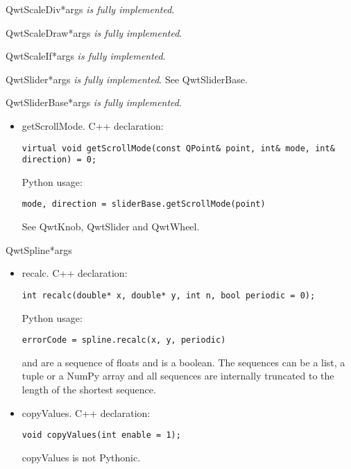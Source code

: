 \documentclass{manual}
\begin{document}
\begin{classdesc}{QwtScaleDiv}{*args}
\emph{is fully implemented}.
\end{classdesc}

\begin{classdesc}{QwtScaleDraw}{*args}
\emph{is fully implemented}.
\end{classdesc}

\begin{classdesc}{QwtScaleIf}{*args}
\emph{is fully implemented}.
\end{classdesc}

\begin{classdesc}{QwtSlider}{*args}
\emph{is fully implemented}. See QwtSliderBase.
\end{classdesc}

\begin{classdesc}{QwtSliderBase}{*args}
\emph{is fully implemented}.

  \begin{itemize}

    \item{getScrollMode}. C++ declaration:
      \begin{verbatim}
virtual void getScrollMode(const QPoint& point, int& mode, int& direction) = 0;
      \end{verbatim}
      Python usage:
      \begin{verbatim}
mode, direction = sliderBase.getScrollMode(point)
      \end{verbatim}
      See QwtKnob, QwtSlider and QwtWheel.

  \end{itemize}
\end{classdesc}

\begin{classdesc}{QwtSpline}{*args}
  
  \begin{itemize}

    \item{recalc}. C++ declaration:
      \begin{verbatim}
int recalc(double* x, double* y, int n, bool periodic = 0);
      \end{verbatim}
      Python usage:
      \begin{verbatim}
errorCode = spline.recalc(x, y, periodic)
      \end{verbatim}
       and  are a sequence of floats and  is a
      boolean.
      The sequences can be a list, a tuple or a NumPy array and all sequences
      are internally truncated to the length of the shortest sequence.

    \item{copyValues}. C++ declaration:
      \begin{verbatim}
void copyValues(int enable = 1);
      \end{verbatim}
      copyValues is not Pythonic.

  \end{itemize}
\end{classdesc}
 
\end{document}
